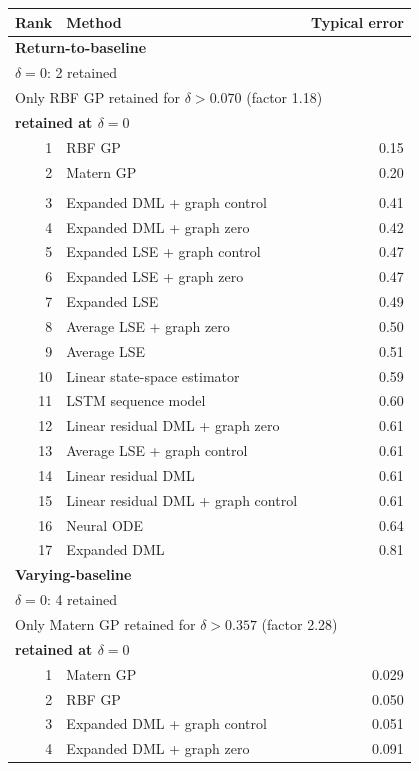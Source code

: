 \begin{tabular}{rlr}
\toprule
Rank & Method & Typical error \\
\midrule
\multicolumn{3}{l}{\textbf{Return-to-baseline}} \\
\multicolumn{3}{l}{\(\delta=0\): 2 retained} \\
\multicolumn{3}{l}{Only RBF GP retained for \(\delta>0.070\) (factor 1.18)} \\
\multicolumn{3}{l}{\textbf{retained at \(\delta=0\)}} \\
1 & RBF GP & 0.15 \\
2 & Matern GP & 0.20 \\
\addlinespace[2pt]
\multicolumn{3}{l}{\textbf{not retained at \(\delta=0\)}} \\
3 & Expanded DML + graph control & 0.41 \\
4 & Expanded DML + graph zero & 0.42 \\
5 & Expanded LSE + graph control & 0.47 \\
6 & Expanded LSE + graph zero & 0.47 \\
7 & Expanded LSE & 0.49 \\
8 & Average LSE + graph zero & 0.50 \\
9 & Average LSE & 0.51 \\
10 & Linear state-space estimator & 0.59 \\
11 & LSTM sequence model & 0.60 \\
12 & Linear residual DML + graph zero & 0.61 \\
13 & Average LSE + graph control & 0.61 \\
14 & Linear residual DML & 0.61 \\
15 & Linear residual DML + graph control & 0.61 \\
16 & Neural ODE & 0.64 \\
17 & Expanded DML & 0.81 \\
\midrule
\multicolumn{3}{l}{\textbf{Varying-baseline}} \\
\multicolumn{3}{l}{\(\delta=0\): 4 retained} \\
\multicolumn{3}{l}{Only Matern GP retained for \(\delta>0.357\) (factor 2.28)} \\
\multicolumn{3}{l}{\textbf{retained at \(\delta=0\)}} \\
1 & Matern GP & 0.029 \\
2 & RBF GP & 0.050 \\
3 & Expanded DML + graph control & 0.051 \\
4 & Expanded DML + graph zero & 0.091 \\

\end{tabular}
